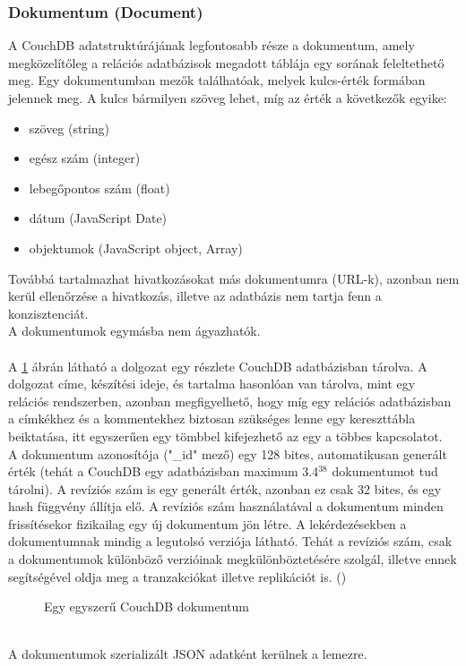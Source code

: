 		\subsubsection{Dokumentum (Document)}
			\label{subsec:couchdbdocument}
			A CouchDB adatstruktúrájának legfontosabb része a dokumentum, amely megközelítőleg a relációs adatbázisok megadott táblája egy sorának feleltethető meg. Egy dokumentumban mezők találhatóak, melyek kulcs-érték formában jelennek meg. A kulcs bármilyen szöveg lehet, míg az érték a következők egyike:
			\begin{itemize}
				\item szöveg (string)
				\item egész szám (integer)
				\item lebegőpontos szám (float)
				\item dátum (JavaScript Date)
				\item objektumok (JavaScript object, Array)
			\end{itemize}
			Továbbá tartalmazhat hivatkozásokat más dokumentumra (URL-k), azonban nem kerül ellenőrzése a hivatkozás, illetve az adatbázis nem tartja fenn a konzisztenciát.
			\\
			A dokumentumok egymásba nem ágyazhatók.\hfill\\
			\\
			A \ref{fig:simple_couchdb_json} ábrán látható a dolgozat egy részlete CouchDB adatbázisban tárolva. A dolgozat címe, készítési ideje, és tartalma hasonlóan van tárolva, mint egy relációs rendszerben, azonban megfigyelhető, hogy míg egy relációs adatbázisban a címkékhez és a kommentekhez biztosan szükséges lenne egy kereszttábla beiktatása, itt egyszerűen egy tömbbel kifejezhető az egy a többes kapcsolatot.\\
			A dokumentum azonosítója ("\_id" mező) egy 128 bites, automatikusan generált érték (tehát a CouchDB egy adatbázisban maximum 3.4$^{38}$ dokumentumot tud tárolni). A revíziós szám is egy generált érték, azonban ez csak 32 bites, és egy hash függvény állítja elő. A revíziós szám használatával a dokumentum minden frissítésekor fizikailag egy új dokumentum jön létre. A lekérdezésekben a dokumentumnak mindig a legutolsó verziója látható. Tehát a revíziós szám, csak a dokumentumok különböző verzióinak megkülönböztetésére szolgál, illetve ennek segítségével oldja meg a tranzakciókat illetve replikációt is. ()
			\begin{figure}[ht]
				\centering
					
					\caption{Egy egyszerű CouchDB dokumentum}
					\label{fig:simple_couchdb_json}
			\end{figure}
			\\
			A dokumentumok szerializált JSON adatként kerülnek a lemezre.
